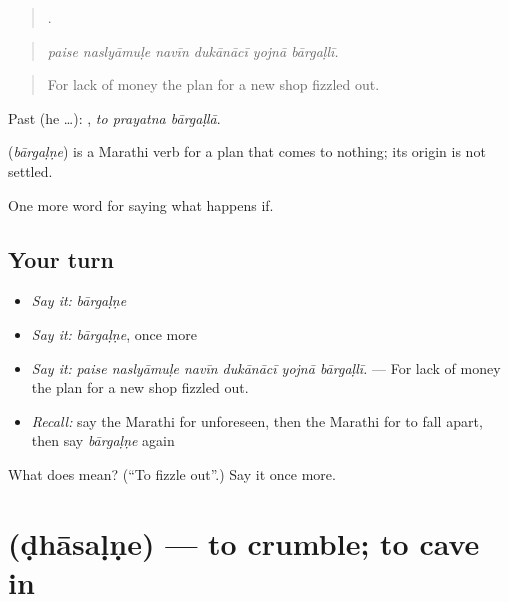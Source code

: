 \begin{quote}
     .
\end{quote}

\begin{quote}
\emph{paise naslyāmuḷe navīn dukānācī yojnā bārgaḷlī.}
\end{quote}

\begin{quote}
For lack of money the plan for a new shop fizzled out.
\end{quote}

Past (he …):   , \emph{to prayatna bārgaḷlā}.

\begin{cousinweb}
\textbf{} (\emph{bārgaḷṇe}) is a Marathi verb for a plan that comes to nothing; its origin is not settled.
\end{cousinweb}

\begin{grammarlens}[title={What you've built}]
One more word for saying what happens if.
\end{grammarlens}

\subsection*{Your turn}
\begin{itemize}
\raggedright
  \item \emph{Say it:} \emph{bārgaḷṇe}
  \item \emph{Say it:} \emph{bārgaḷṇe}, once more
  \item \emph{Say it:} \emph{paise naslyāmuḷe navīn dukānācī yojnā bārgaḷlī.} — For lack of money the plan for a new shop fizzled out.
  \item \emph{Recall:} say the Marathi for unforeseen, then the Marathi for to fall apart, then say \emph{bārgaḷṇe} again
\end{itemize}

\begin{tcolorbox}[breakable,colback=teal!4,colframe=teal!35!black,title={Before you move on}]
What does  mean? (\textquotedblleft{}To fizzle out\textquotedblright{}.) Say it once more.
\end{tcolorbox}
\section[\texorpdfstring{\mr{ढासळणे} (ḍhāsaḷṇe)}{ढासळणे (ḍhāsaḷṇe)}]{ (ḍhāsaḷṇe) — to crumble; to cave in}

